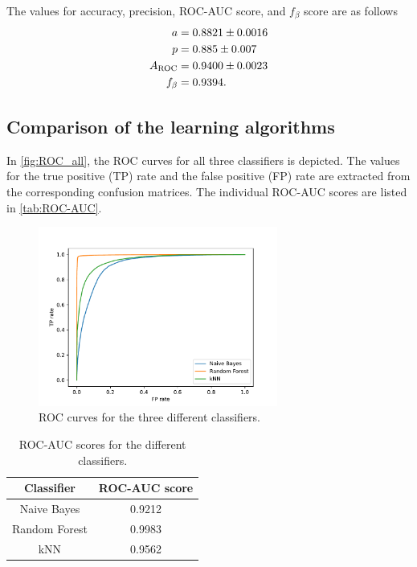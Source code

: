 The values for accuracy, precision, ROC-AUC score, and $f_{\beta}$ score are as follows
\begin{align*}
    a &= \num{0.8821+-0.0016} \\
    p &= \num{0.885+-0.007}  \\
    A_{\mathrm{ROC}} &= \num{0.9400+-0.0023} \\
    f_{\beta} &= \num{0.9394}.
\end{align*}

\subsection{Comparison of the learning algorithms}
In \autoref{fig:ROC_all}, the ROC curves for all three classifiers is depicted. The values for the true positive (TP) rate and the false positive (FP) rate are
extracted from the corresponding confusion matrices. The individual ROC-AUC scores are listed in \autoref{tab:ROC-AUC}.
\begin{figure}
    \centering
    \includegraphics[width=0.7\textwidth]{content/plots/ROC_all.pdf}
    \caption{ROC curves for the three different classifiers.}
    \label{fig:ROC_all}
\end{figure}
\begin{table}
    \centering
    \caption{ROC-AUC scores for the different classifiers.}
    \label{tab:ROC-AUC}
      \begin{tabular}{c S}
        \toprule
        {Classifier} & {ROC-AUC score} \\
        \midrule
        {Naive Bayes}   & 0.9212 \\
        {Random Forest} & 0.9983 \\
        {kNN}           & 0.9562 \\
        \bottomrule 
      \end{tabular} 
  \end{table}

